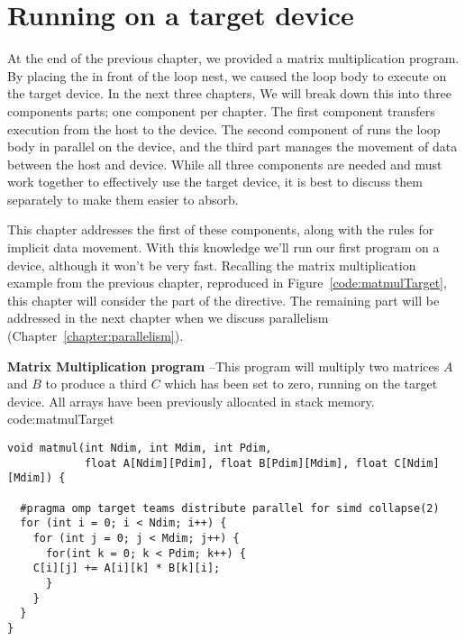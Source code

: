 
\def\ArtDir{03.Target/figures}%
 
\chapter{Running on a target device}
\label{chapter:target}

At the end of the previous chapter, we provided a 
matrix multiplication program.   By placing the \BUD in front 
of the loop nest, we caused the loop body to execute on the target 
device.  In the next three chapters, We will break down this \BUD into 
three components parts; one component per chapter.    
The first component transfers execution from 
the host to the device. The second component of \BUD runs the 
loop body in parallel on the device, and the third part manages the 
movement of data between the host and device.  While all three components 
are needed and must work together to effectively use the target device, 
it is best to discuss them separately to make them easier to absorb.

This chapter addresses the first of these components, along with the 
rules for implicit data movement.  With this knowledge we'll run
our first program on a device, although it won't be very fast.
Recalling the matrix multiplication example from the previous chapter, 
reproduced in Figure~\ref{code:matmulTarget}, this chapter 
will consider the  part of the directive.
The remaining part will be addressed in the next chapter when we discuss parallelism (Chapter~\ref{chapter:parallelism}).

\begin{CodeExample}%
{\textbf{Matrix Multiplication program} --\small This program will multiply two matrices $A$ and $B$
to produce a third $C$ which has been set to zero, running on the target device.
All arrays have been previously allocated in stack memory.
}%
{code:matmulTarget}
\begin{lstlisting}
void matmul(int Ndim, int Mdim, int Pdim,
            float A[Ndim][Pdim], float B[Pdim][Mdim], float C[Ndim][Mdim]) {

  #pragma omp target teams distribute parallel for simd collapse(2)
  for (int i = 0; i < Ndim; i++) {
    for (int j = 0; j < Mdim; j++) {
      for(int k = 0; k < Pdim; k++) {
	C[i][j] += A[i][k] * B[k][i];
      }
    }
  }
}
\end{lstlisting}
\end{CodeExample}




